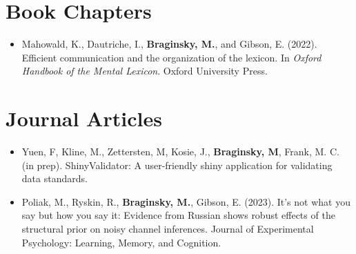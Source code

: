 \documentclass[11pt,]{article}
\providecommand{\tightlist}{%
  \setlength{\itemsep}{0pt}\setlength{\parskip}{0pt}}
\begin{document}
\section{Book Chapters}\label{book-chapters}

\begin{itemize}
\tightlist
\item
  Mahowald, K., Dautriche, I., \textbf{Braginsky, M.}, and Gibson, E.
  (2022). Efficient communication and the organization of the lexicon.
  In \emph{Oxford Handbook of the Mental Lexicon}. Oxford University
  Press.
\end{itemize}

\section{Journal Articles}\label{journal-articles}

\begin{itemize}
\item
  Yuen, F, Kline, M., Zettersten, M, Kosie, J., \textbf{Braginsky, M},
  Frank, M. C. (in prep). ShinyValidator: A user-friendly shiny
  application for validating data standards.
\item
  Poliak, M., Ryskin, R., \textbf{Braginsky, M.}, Gibson, E. (2023).
  It's not what you say but how you say it: Evidence from Russian shows
  robust effects of the structural prior on noisy channel inferences.
  Journal of Experimental Psychology: Learning, Memory, and Cognition.
\end{itemize}
\end{document}

